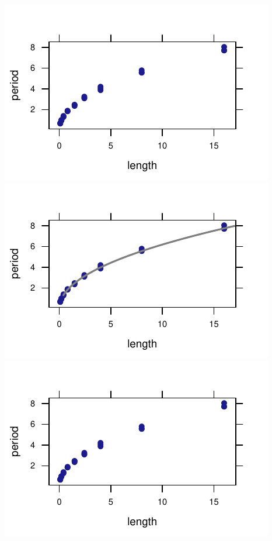 \documentclass[twoside]{book}\usepackage[]{graphicx}\usepackage[]{xcolor}
\makeatletter
\def\maxwidth{ %
  \ifdim\Gin@nat@width>\linewidth
    \linewidth
  \else
    \Gin@nat@width
  \fi
}
\newenvironment{knitrout}{}{} %
\makeatother
\begin{document}
\begin{solution}
\begin{knitrout}
{\centering \includegraphics[width=\maxwidth]{figures/fig-unnamed-chunk-211-1} 
\includegraphics[width=\maxwidth]{figures/fig-unnamed-chunk-211-2} 
\includegraphics[width=\maxwidth]{figures/fig-unnamed-chunk-211-3} 
}
\end{knitrout}
\end{solution}
\end{document}
